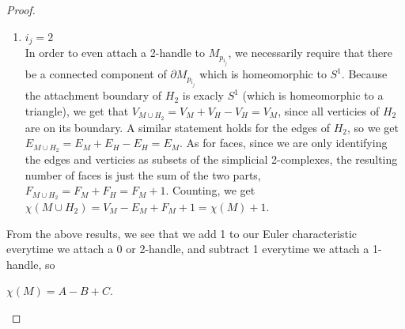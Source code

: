 \documentclass[12pt]{article}
\theoremstyle{definition}
\begin{document}
\begin{proof}
\begin{enumerate}
            \item $i_j = 2$\\
            In order to even attach a 2-handle to $M_{p_{i_j}}$, we necessarily require that there be a connected component of $\partial M_{p_{i_j}}$ which is homeomorphic to $S^1$. Because the attachment boundary of $H_2$ is exacly $S^1$ (which is homeomorphic to a triangle), we get that $V_{M\cup H_2} = V_M + V_H - V_H = V_M$, since all verticies of $H_2$ are on its boundary. A similar statement holds for the edges of $H_2$, so we get $E_{M\cup H_2} = E_M + E_H - E_H = E_M$. As for faces, since we are only identifying the edges and verticies as subsets of the simplicial 2-complexes, the resulting number of faces is just the sum of the two parts, $F_{M\cup H_2} = F_M + F_H = F_M + 1$. Counting, we get $\chi(M\cup H_2) = V_M -E_M + F_M +1 = \chi(M) + 1$. 
      \end{enumerate}

      From the above results, we see that we add 1 to our Euler characteristic everytime we attach a 0 or 2-handle, and subtract 1 everytime we attach a 1-handle, so 
      \begin{center}
            $\chi(M) = A-B+C$. 
      \end{center}
\end{proof}



\end{document}
